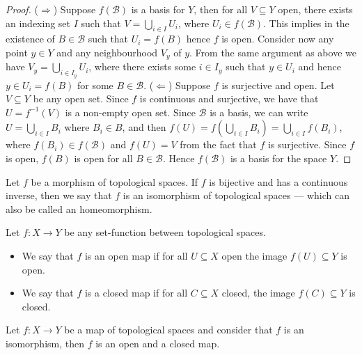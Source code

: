 \begin{proof}
    (\(\Rightarrow\)) Suppose \(f(\mathcal B)\) is a basis for \(Y\), then for all
    \(V \subseteq Y\) open, there exists an indexing set \(I\) such that \(V =
    \bigcup_{i \in  I} U_i\), where \(U_i \in f(\mathcal B)\). This implies in the
    existence of \(B \in \mathcal B\) such that \(U_i = f(B)\) hence \(f\) is
    open. Consider now any point \(y \in Y\) and any neighbourhood \(V_y\) of
    \(y\). From the same argument as above we have \(V_y = \bigcup_{i \in  I_y}
    U_i\), where there exists some \(i \in I_y\) such that \(y \in U_i\) and hence
    \(y \in U_i = f(B)\) for some \(B \in \mathcal B\).
    (\(\Leftarrow\)) Suppose \(f\) is surjective and open. Let \(V \subseteq Y\)
    be any open set. Since \(f\) is continuous and surjective, we have that
    \(U = f^{-1}(V)\) is a non-empty open set. Since \(\mathcal B\) is a basis, we
    can write \(U = \bigcup_{i \in  I} B_i\) where \(B_i \in B\), and then \(f(U)
    = f\left( \bigcup_{i \in  I} B_i \right) = \bigcup_{i \in I} f(B_i)\), where
    \(f(B_i) \in f(\mathcal B)\) and \(f(U) = V\) from the fact that \(f\) is
    surjective. Since \(f\) is open, \(f(B)\) is open for all \(B \in \mathcal
    B\). Hence \(f(\mathcal B)\) is a basis for the space \(Y\).
\end{proof}

\begin{definition}[Isomorphism]\label{def: homeomorphism}
    Let \(f\) be a morphism of topological spaces. If \(f\) is bijective and has a
    continuous inverse, then we say that \(f\) is an isomorphism of topological
    spaces --- which can also be called an homeomorphism.
\end{definition}

\begin{definition}\label{def: open/closed maps}
    Let \(f : X \to Y\) be any set-function between topological spaces.
    \begin{itemize}\setlength\itemsep{0em}
        \item We say that \(f\) is an open map if for all \(U \subseteq X\) open the
              image \(f(U) \subseteq Y\) is open.
        \item We say that \(f\) is a closed map if for all \(C \subseteq X\) closed,
              the image \(f(C) \subseteq Y\) is closed.
    \end{itemize}
\end{definition}

\begin{proposition}\label{prop:homeomorphism-is-open-closed}
    Let \(f: X \to Y\) be a map of topological spaces and consider that \(f\) is an
    isomorphism, then \(f\) is an open and a closed map.
\end{proposition}

